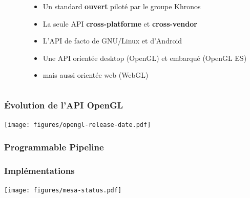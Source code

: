 \begin{frame}
\begin{columns}
\begin{column}{.2\textwidth}
\begin{center}
      \end{center}
    \end{column}
    \begin{column}{.8\textwidth}
      \begin{itemize}
        \item Un standard \textbf{ouvert} piloté par le groupe Khronos
        \item La seule API \textbf{cross-platforme} et \textbf{cross-vendor} %
        \item L'API de facto de GNU/Linux et d'Android
        \item Une API orientée desktop (OpenGL) et embarqué (OpenGL ES)
        \item mais aussi orientée web (WebGL)
      \end{itemize}
    \end{column}
  \end{columns}
\end{frame}

\begin{frame}
  \frametitle{Évolution de l'API OpenGL}
  \begin{center}
    \texttt{[image: figures/opengl-release-date.pdf]} %
  \end{center}
\end{frame}

\begin{frame}
  \frametitle{Programmable Pipeline}
\end{frame}

\begin{frame}
  \frametitle{Implémentations}
  \begin{center}
    \texttt{[image: figures/mesa-status.pdf]} %
  \end{center}
\end{frame}

